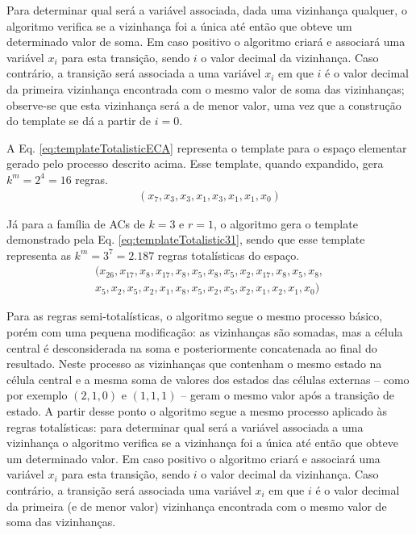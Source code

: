 Para determinar qual será a variável associada, dada uma vizinhança qualquer, o algoritmo verifica se a vizinhança foi a única até então que obteve um determinado valor de soma. Em caso positivo o algoritmo criará e associará uma variável $x_i$ para esta transição, sendo $i$ o valor decimal da vizinhança. Caso contrário, a transição será associada a uma variável $x_i$ em que $i$ é o valor decimal da primeira vizinhança encontrada com o mesmo valor de soma das vizinhanças; observe-se que esta vizinhança será a de menor valor, uma vez que a construção do template se dá a partir de $i=0$.

A Eq. \eqref{eq:templateTotalisticECA} representa o template para o espaço elementar gerado pelo processo descrito acima. Esse template, quando expandido, gera $k^m = 2^4 = 16$ regras.
\begin{equation}
\begin{split}
(x_7,x_3,x_3,x_1,x_3,x_1,x_1,x_0)
\label{eq:templateTotalisticECA}
\end{split}
\end{equation}

Já para a família de ACs de $k=3$ e $r=1$, o algoritmo gera o template demonstrado pela Eq. \eqref{eq:templateTotalistic31}, sendo que esse template representa as $k^m = 3^7 = 2.187$ regras totalísticas do espaço.
\begin{equation}
\begin{split}
(x_{26},x_{17},x_8,x_{17},x_8,x_5,x_8,x_5,x_2,x_{17},x_8,x_5,x_8,\\
x_5,x_2,x_5,x_2,x_1,x_8,x_5,x_2,x_5,x_2,x_1,x_2,x_1,x_0)
\label{eq:templateTotalistic31}
\end{split}
\end{equation}

Para as regras semi-totalísticas, o algoritmo segue o mesmo processo básico, porém com uma pequena modificação: as vizinhanças são somadas, mas a célula central é desconsiderada na soma e posteriormente concatenada ao final do resultado. Neste processo as vizinhanças que contenham o mesmo estado na célula central e a mesma soma de valores dos estados das células externas -- como por exemplo $(2,1,0)$ e $(1,1,1)$ -- geram o mesmo valor após a transição de estado. A partir desse ponto o algoritmo segue a mesmo processo aplicado às regras totalísticas: para determinar qual será a variável associada a uma vizinhança o algoritmo verifica se a vizinhança foi a única até então que obteve um determinado valor. Em caso positivo o algoritmo criará e associará uma variável $x_i$ para esta transição, sendo $i$ o valor decimal da vizinhança. Caso contrário, a transição será associada uma variável $x_i$ em que $i$ é o valor decimal da primeira (e de menor valor) vizinhança encontrada com o mesmo valor de soma das vizinhanças.

